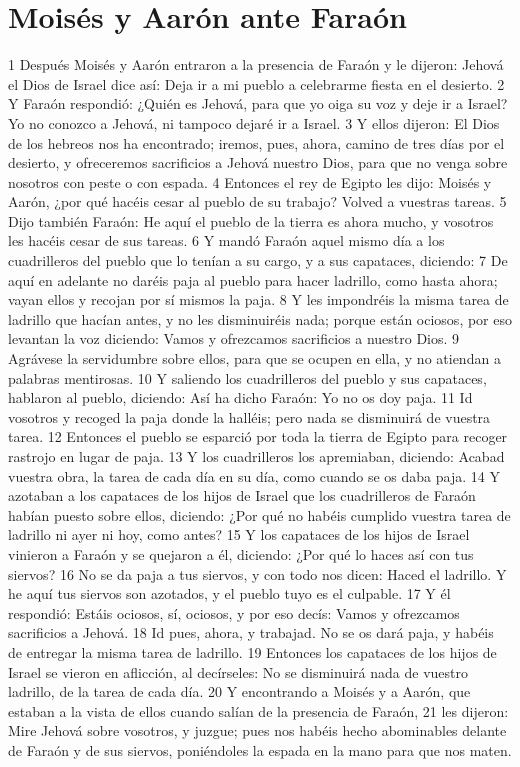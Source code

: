 \section*{Moisés y Aarón ante Faraón}
1 Después Moisés y Aarón entraron a la presencia de Faraón y le dijeron: Jehová el Dios de Israel dice así: Deja ir a mi pueblo a celebrarme fiesta en el desierto.
2 Y Faraón respondió: ¿Quién es Jehová, para que yo oiga su voz y deje ir a Israel? Yo no conozco a Jehová, ni tampoco dejaré ir a Israel.
3 Y ellos dijeron: El Dios de los hebreos nos ha encontrado; iremos, pues, ahora, camino de tres días por el desierto, y ofreceremos sacrificios a Jehová nuestro Dios, para que no venga sobre nosotros con peste o con espada.
4 Entonces el rey de Egipto les dijo: Moisés y Aarón, ¿por qué hacéis cesar al pueblo de su trabajo? Volved a vuestras tareas.
5 Dijo también Faraón: He aquí el pueblo de la tierra es ahora mucho, y vosotros les hacéis cesar de sus tareas.
6 Y mandó Faraón aquel mismo día a los cuadrilleros del pueblo que lo tenían a su cargo, y a sus capataces, diciendo:
7 De aquí en adelante no daréis paja al pueblo para hacer ladrillo, como hasta ahora; vayan ellos y recojan por sí mismos la paja.
8 Y les impondréis la misma tarea de ladrillo que hacían antes, y no les disminuiréis nada; porque están ociosos, por eso levantan la voz diciendo: Vamos y ofrezcamos sacrificios a nuestro Dios.
9 Agrávese la servidumbre sobre ellos, para que se ocupen en ella, y no atiendan a palabras mentirosas.
10 Y saliendo los cuadrilleros del pueblo y sus capataces, hablaron al pueblo, diciendo: Así ha dicho Faraón: Yo no os doy paja.
11 Id vosotros y recoged la paja donde la halléis; pero nada se disminuirá de vuestra tarea.
12 Entonces el pueblo se esparció por toda la tierra de Egipto para recoger rastrojo en lugar de paja.
13 Y los cuadrilleros los apremiaban, diciendo: Acabad vuestra obra, la tarea de cada día en su día, como cuando se os daba paja.
14 Y azotaban a los capataces de los hijos de Israel que los cuadrilleros de Faraón habían puesto sobre ellos, diciendo: ¿Por qué no habéis cumplido vuestra tarea de ladrillo ni ayer ni hoy, como antes?
15 Y los capataces de los hijos de Israel vinieron a Faraón y se quejaron a él, diciendo: ¿Por qué lo haces así con tus siervos?
16 No se da paja a tus siervos, y con todo nos dicen: Haced el ladrillo. Y he aquí tus siervos son azotados, y el pueblo tuyo es el culpable.
17 Y él respondió: Estáis ociosos, sí, ociosos, y por eso decís: Vamos y ofrezcamos sacrificios a Jehová.
18 Id pues, ahora, y trabajad. No se os dará paja, y habéis de entregar la misma tarea de ladrillo.
19 Entonces los capataces de los hijos de Israel se vieron en aflicción, al decírseles: No se disminuirá nada de vuestro ladrillo, de la tarea de cada día.
20 Y encontrando a Moisés y a Aarón, que estaban a la vista de ellos cuando salían de la presencia de Faraón,
21 les dijeron: Mire Jehová sobre vosotros, y juzgue; pues nos habéis hecho abominables delante de Faraón y de sus siervos, poniéndoles la espada en la mano para que nos maten.

